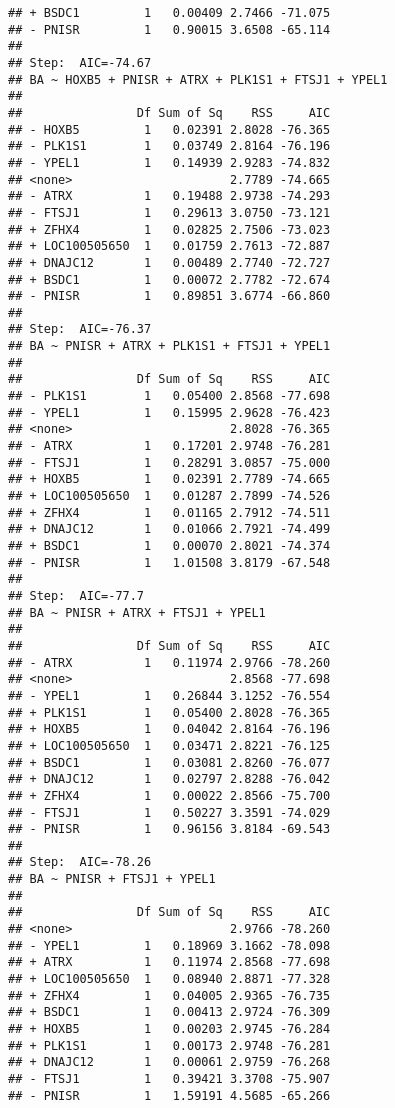 \documentclass[12pt,dutch,coursenotes]{book}
\theoremstyle{definition}
\theoremstyle{definition}
\theoremstyle{definition}
\theoremstyle{remark}
\begin{document}
\begin{verbatim}
## + BSDC1         1   0.00409 2.7466 -71.075
## - PNISR         1   0.90015 3.6508 -65.114
## 
## Step:  AIC=-74.67
## BA ~ HOXB5 + PNISR + ATRX + PLK1S1 + FTSJ1 + YPEL1
## 
##                Df Sum of Sq    RSS     AIC
## - HOXB5         1   0.02391 2.8028 -76.365
## - PLK1S1        1   0.03749 2.8164 -76.196
## - YPEL1         1   0.14939 2.9283 -74.832
## <none>                      2.7789 -74.665
## - ATRX          1   0.19488 2.9738 -74.293
## - FTSJ1         1   0.29613 3.0750 -73.121
## + ZFHX4         1   0.02825 2.7506 -73.023
## + LOC100505650  1   0.01759 2.7613 -72.887
## + DNAJC12       1   0.00489 2.7740 -72.727
## + BSDC1         1   0.00072 2.7782 -72.674
## - PNISR         1   0.89851 3.6774 -66.860
## 
## Step:  AIC=-76.37
## BA ~ PNISR + ATRX + PLK1S1 + FTSJ1 + YPEL1
## 
##                Df Sum of Sq    RSS     AIC
## - PLK1S1        1   0.05400 2.8568 -77.698
## - YPEL1         1   0.15995 2.9628 -76.423
## <none>                      2.8028 -76.365
## - ATRX          1   0.17201 2.9748 -76.281
## - FTSJ1         1   0.28291 3.0857 -75.000
## + HOXB5         1   0.02391 2.7789 -74.665
## + LOC100505650  1   0.01287 2.7899 -74.526
## + ZFHX4         1   0.01165 2.7912 -74.511
## + DNAJC12       1   0.01066 2.7921 -74.499
## + BSDC1         1   0.00070 2.8021 -74.374
## - PNISR         1   1.01508 3.8179 -67.548
## 
## Step:  AIC=-77.7
## BA ~ PNISR + ATRX + FTSJ1 + YPEL1
## 
##                Df Sum of Sq    RSS     AIC
## - ATRX          1   0.11974 2.9766 -78.260
## <none>                      2.8568 -77.698
## - YPEL1         1   0.26844 3.1252 -76.554
## + PLK1S1        1   0.05400 2.8028 -76.365
## + HOXB5         1   0.04042 2.8164 -76.196
## + LOC100505650  1   0.03471 2.8221 -76.125
## + BSDC1         1   0.03081 2.8260 -76.077
## + DNAJC12       1   0.02797 2.8288 -76.042
## + ZFHX4         1   0.00022 2.8566 -75.700
## - FTSJ1         1   0.50227 3.3591 -74.029
## - PNISR         1   0.96156 3.8184 -69.543
## 
## Step:  AIC=-78.26
## BA ~ PNISR + FTSJ1 + YPEL1
## 
##                Df Sum of Sq    RSS     AIC
## <none>                      2.9766 -78.260
## - YPEL1         1   0.18969 3.1662 -78.098
## + ATRX          1   0.11974 2.8568 -77.698
## + LOC100505650  1   0.08940 2.8871 -77.328
## + ZFHX4         1   0.04005 2.9365 -76.735
## + BSDC1         1   0.00413 2.9724 -76.309
## + HOXB5         1   0.00203 2.9745 -76.284
## + PLK1S1        1   0.00173 2.9748 -76.281
## + DNAJC12       1   0.00061 2.9759 -76.268
## - FTSJ1         1   0.39421 3.3708 -75.907
## - PNISR         1   1.59191 4.5685 -65.266
\end{verbatim}
\end{document}
